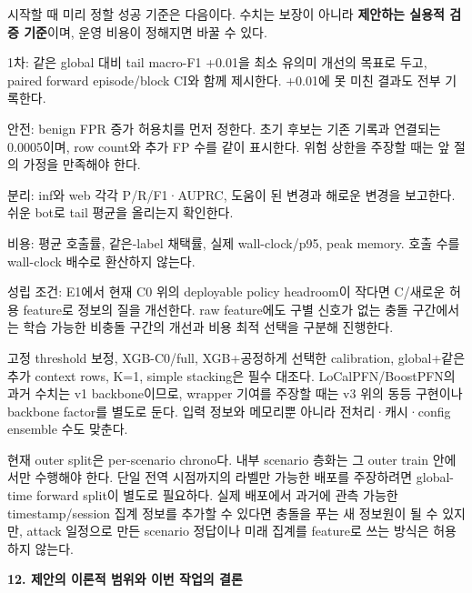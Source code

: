 시작할 때 미리 정할 성공 기준은 다음이다. 수치는 보장이 아니라 \textbf{제안하는 실용적 검증 기준}이며, 운영 비용이 정해지면 바꿀 수 있다.

\par\noindent \textbullet\enspace 1차: 같은 global 대비 tail macro-F1 +\allowbreak{}0.01을 최소 유의미 개선의 목표로 두고, paired forward episode/\allowbreak{}block CI와 함께 제시한다. +\allowbreak{}0.01에 못 미친 결과도 전부 기록한다.


\par\noindent \textbullet\enspace 안전: benign FPR 증가 허용치를 먼저 정한다. 초기 후보는 기존 기록과 연결되는 0.0005이며, row count와 추가 FP 수를 같이 표시한다. 위험 상한을 주장할 때는 앞 절의 가정을 만족해야 한다.


\par\noindent \textbullet\enspace 분리: inf와 web 각각 P/\allowbreak{}R/\allowbreak{}F1·AUPRC, 도움이 된 변경과 해로운 변경을 보고한다. 쉬운 bot로 tail 평균을 올리는지 확인한다.


\par\noindent \textbullet\enspace 비용: 평균 호출률, 같은-label 채택률, 실제 wall-clock/\allowbreak{}p95, peak memory. 호출 수를 wall-clock 배수로 환산하지 않는다.


\par\noindent \textbullet\enspace 성립 조건: E1에서 현재 C0 위의 deployable policy headroom이 작다면 C/\allowbreak{}새로운 허용 feature로 정보의 질을 개선한다. raw feature에도 구별 신호가 없는 충돌 구간에서는 학습 가능한 비충돌 구간의 개선과 비용 최적 선택을 구분해 진행한다.


고정 threshold 보정, XGB-C0/\allowbreak{}full, XGB+\allowbreak{}공정하게 선택한 calibration, global+\allowbreak{}같은 추가 context rows, K=\allowbreak{}1, simple stacking은 필수 대조다. LoCalPFN/\allowbreak{}BoostPFN의 과거 수치는 v1 backbone이므로, wrapper 기여를 주장할 때는 v3 위의 동등 구현이나 backbone factor를 별도로 둔다. 입력 정보와 메모리뿐 아니라 전처리·캐시·config ensemble 수도 맞춘다.

현재 outer split은 per-scenario chrono다. 내부 scenario 층화는 그 outer train 안에서만 수행해야 한다. 단일 전역 시점까지의 라벨만 가능한 배포를 주장하려면 global-time forward split이 별도로 필요하다. 실제 배포에서 과거에 관측 가능한 timestamp/\allowbreak{}session 집계 정보를 추가할 수 있다면 충돌을 푸는 새 정보원이 될 수 있지만, attack 일정으로 만든 scenario 정답이나 미래 집계를 feature로 쓰는 방식은 허용하지 않는다.

\textbf{12. 제안의 이론적 범위와 이번 작업의 결론}

